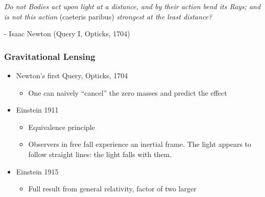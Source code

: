 \documentclass{beamer}
\begin{document}
\frame
{

    {\Large 
        {\em Do not Bodies act upon light at a distance, and by their action bend its Rays;
        and is not this action } (caeteris paribus) {\em strongest at the least distance?}
        \newline

        \hfill - Isaac Newton (Query I, Opticks, 1704)
    }
}

\frame
{
    \frametitle{Gravitational Lensing}

 
    \begin{itemize}

        \item Newton's first Query, Opticks, 1704
            \begin{itemize}
                \item One can naively ``cancel'' the zero masses and predict
                    the effect
            \end{itemize}

        \item Einstein 1911
            \begin{itemize}

                \item Equivalence principle

                \item Observers in free fall experience an inertial frame.  The
                    light appears to follow straight lines: the light falls
                    with them.

            \end{itemize}

        \item Einstein 1915
            \begin{itemize}
                \item Full result from general relativity, factor of two larger
            \end{itemize}


    \end{itemize}

}


	
\end{document}
